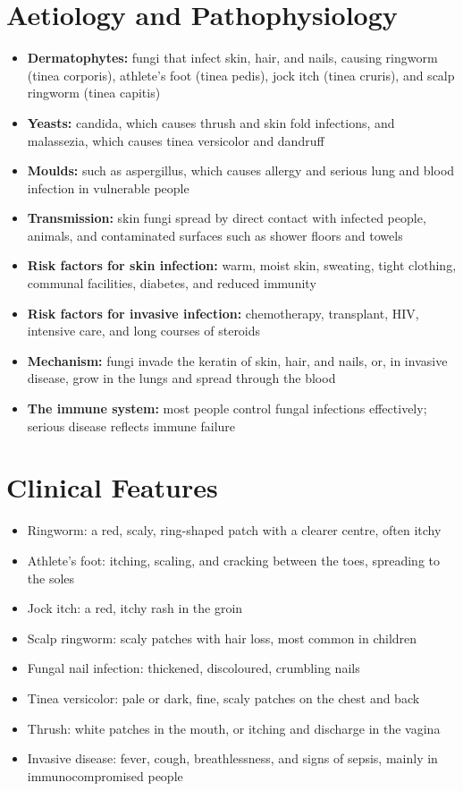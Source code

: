 \section*{Aetiology and Pathophysiology}
\begin{itemize}
    \item \textbf{Dermatophytes:} fungi that infect skin, hair, and nails, causing ringworm (tinea corporis), athlete's foot (tinea pedis), jock itch (tinea cruris), and scalp ringworm (tinea capitis)
    \item \textbf{Yeasts:} candida, which causes thrush and skin fold infections, and malassezia, which causes tinea versicolor and dandruff
    \item \textbf{Moulds:} such as aspergillus, which causes allergy and serious lung and blood infection in vulnerable people
    \item \textbf{Transmission:} skin fungi spread by direct contact with infected people, animals, and contaminated surfaces such as shower floors and towels
    \item \textbf{Risk factors for skin infection:} warm, moist skin, sweating, tight clothing, communal facilities, diabetes, and reduced immunity
    \item \textbf{Risk factors for invasive infection:} chemotherapy, transplant, HIV, intensive care, and long courses of steroids
    \item \textbf{Mechanism:} fungi invade the keratin of skin, hair, and nails, or, in invasive disease, grow in the lungs and spread through the blood
    \item \textbf{The immune system:} most people control fungal infections effectively; serious disease reflects immune failure
\end{itemize}

\section*{Clinical Features}
\begin{itemize}
    \item Ringworm: a red, scaly, ring-shaped patch with a clearer centre, often itchy
    \item Athlete's foot: itching, scaling, and cracking between the toes, spreading to the soles
    \item Jock itch: a red, itchy rash in the groin
    \item Scalp ringworm: scaly patches with hair loss, most common in children
    \item Fungal nail infection: thickened, discoloured, crumbling nails
    \item Tinea versicolor: pale or dark, fine, scaly patches on the chest and back
    \item Thrush: white patches in the mouth, or itching and discharge in the vagina
    \item Invasive disease: fever, cough, breathlessness, and signs of sepsis, mainly in immunocompromised people
\end{itemize}

